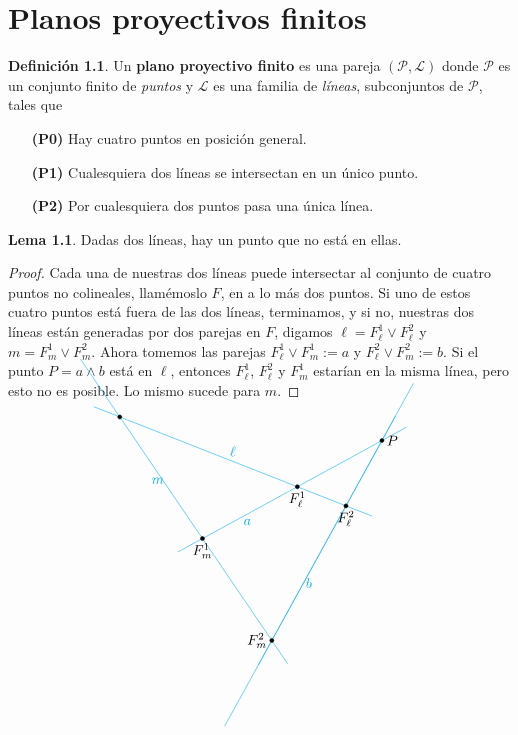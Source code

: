 \documentclass[spanish]{book}
\theoremstyle{definition}
\newtheorem*{defn}{Definición}
\newtheorem*{lema}{Lema}
\begin{document}
\chapter{Planos proyectivos finitos}
\begin{defn}
	Un \textbf{plano proyectivo finito} es una pareja $(\mathcal{P},\mathcal{L})$ donde $\mathcal{P}$ es un conjunto finito de \textit{puntos} y $\mathcal{L}$ es una familia de \textit{líneas}, subconjuntos de $\mathcal{P}$, tales que
	\begin{itemize}
		\item[\textbf{(P0)}] Hay cuatro puntos en posición general.
		\item[\textbf{(P1)}] Cualesquiera dos líneas se intersectan en un único punto.
		\item[\textbf{(P2)}] Por cualesquiera dos puntos pasa una única línea.
	\end{itemize}
\end{defn}
\begin{lema}
	Dadas dos líneas, hay un punto que no está en ellas.
\end{lema}
\begin{proof}
	Cada una de nuestras dos líneas puede intersectar al conjunto de cuatro puntos no colineales, llamémoslo $F$, en a lo más dos puntos. Si uno de estos cuatro puntos está fuera de las dos líneas, terminamos, y si no, nuestras dos líneas están generadas por dos parejas en $F$, digamos $\ell =F^1_\ell\vee F^2_\ell$ y $m=F^1_m\vee F^2_m$. Ahora tomemos las parejas $F^1_\ell\vee F^1_m:=a$ y $F^2_\ell\vee F^2_m:=b$. Si el punto $P=a\wedge b$ está en $\ell$, entonces $F^1_\ell$, $F^2_\ell$ y $F^1_m$ estarían en la misma línea, pero esto no es posible. Lo mismo sucede para $m$.
\end{proof}
\[ \begin{tikzpicture}
	\draw[cyan, shorten >=-20pt, shorten <=-20pt] (-2.04,-1.42) -- (2.4619664439073, 1.0390573012939) node[near start, below] {$a$};
	\draw[cyan, shorten >=-100pt, shorten <=-70pt] (-0.3,-3.98) -- (1.56,-0.6) node[midway, below] {$b$};
	\draw[cyan, shorten >=-20pt, shorten <=-20pt] (1.56,-0.6) -- (-4.1149195804196, 1.6327552447552) node[midway, above] {$\ell$};
	\draw[cyan, shorten >=-50pt, shorten <=-20pt] (-0.3,-3.98) -- (-4.1149195804196, 1.6327552447552) node[near end, below] {$m$};
	\draw[cyan, shorten >=-20pt, shorten <=-20pt] (-0.3,-3.98) -- (2.4619664439073, 1.0390573012939);
	\filldraw (-0.3,-3.98) circle (0.05) node[left] {$F^2_m$};
	\filldraw (1.56,-0.6) circle (0.05) node[below] {$F^2_\ell$};
	\filldraw (0.34,-0.12) circle (0.05) node[below] {$F^1_\ell$};
	\filldraw (-2.04,-1.42) circle (0.05) node[below] {$F^1_m$};
	\filldraw (-4.1149195804196, 1.6327552447552) circle (0.05);
	\filldraw (2.4619664439073, 1.0390573012939) circle (0.05) node[right] {$P$};
\end{tikzpicture}\]
\end{document}
